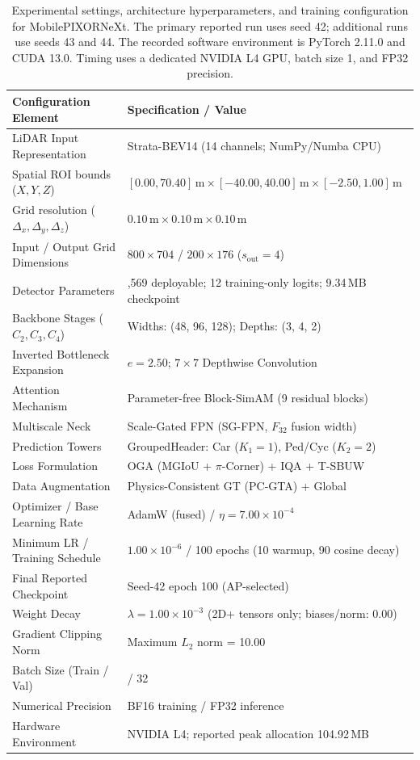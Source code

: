 \begin{table}[t]
\centering\small
\caption{Experimental settings, architecture hyperparameters, and training configuration for MobilePIXORNeXt. The primary reported run uses seed 42; additional runs use seeds 43 and 44. The recorded software environment is PyTorch 2.11.0 and CUDA 13.0. Timing uses a dedicated NVIDIA L4 GPU, batch size 1, and FP32 precision.}
\label{tab:setup}
\begin{tabular}{@{}>{\raggedright\arraybackslash}p{}>{\raggedright\arraybackslash}p{}@{}}
\toprule
\textbf{Configuration Element} & \textbf{Specification / Value} \\
\midrule
LiDAR Input Representation & Strata-BEV14 (14 channels; NumPy/Numba CPU) \\
Spatial ROI bounds ($X, Y, Z$) & $[0.00, 70.40]\,\text{m} \times [-40.00, 40.00]\,\text{m} \times [-2.50, 1.00]\,\text{m}$ \\
Grid resolution ($\Delta_x, \Delta_y, \Delta_z$) & $0.10\,\text{m} \times 0.10\,\text{m} \times 0.10\,\text{m}$ \\
Input / Output Grid Dimensions & $800 \times 704$ / $200 \times 176$ ($s_{\mathrm{out}} = 4$) \\
Detector Parameters & 753,569 deployable; 12 training-only logits; 9.34\,MB checkpoint \\
Backbone Stages ($C_2, C_3, C_4$) & Widths: (48, 96, 128); Depths: (3, 4, 2) \\
Inverted Bottleneck Expansion & $e = 2.50$; $7 \times 7$ Depthwise Convolution \\
Attention Mechanism & Parameter-free Block-SimAM (9 residual blocks) \\
Multiscale Neck & Scale-Gated FPN (SG-FPN, $F_{32}$ fusion width) \\
Prediction Towers & GroupedHeader: Car ($K_1=1$), Ped/Cyc ($K_2=2$) \\
Loss Formulation & OGA (MGIoU + $\pi$-Corner) + IQA + T-SBUW \\
Data Augmentation & Physics-Consistent GT (PC-GTA) + Global \\
Optimizer / Base Learning Rate & AdamW (fused) / $\eta = 7.00 \times 10^{-4}$ \\
Minimum LR / Training Schedule & $1.00 \times 10^{-6}$ / 100 epochs (10 warmup, 90 cosine decay) \\
Final Reported Checkpoint & Seed-42 epoch 100 (AP-selected) \\
Weight Decay & $\lambda = 1.00 \times 10^{-3}$ (2D+ tensors only; biases/norm: 0.00) \\
Gradient Clipping Norm & Maximum $L_2$ norm = 10.00 \\
Batch Size (Train / Val) & 16 / 32 \\
Numerical Precision & BF16 training / FP32 inference \\
Hardware Environment & NVIDIA L4; reported peak allocation 104.92\,MB \\
\bottomrule
\end{tabular}
\end{table}
